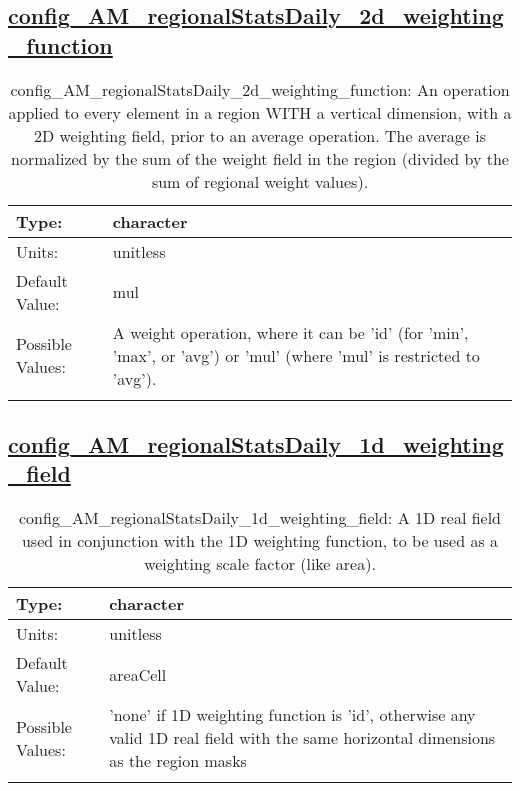 \subsection[config\_AM\_regionalStatsDaily\_2d\_weighting\_function]{\hyperref[sec:nm_tab_AM_regionalStatsDaily]{config\_AM\_regionalStatsDaily\_2d\_weighting\_function}}
\label{subsec:nm_sec_config_AM_regionalStatsDaily_2d_weighting_function}
\begin{center}
\begin{longtable}{| p{2.0in} || p{4.0in} |}
    \hline
    Type: & character \\
    \hline
    Units: & \si{unitless} \\
    \hline
    Default Value: & mul \\
    \hline
    Possible Values: & A weight operation, where it can be 'id' (for 'min', 'max', or 'avg') or 'mul' (where 'mul' is restricted to 'avg'). \\
    \hline
    \caption{config\_AM\_regionalStatsDaily\_2d\_weighting\_function: An operation applied to every element in a region WITH a vertical dimension, with a 2D weighting field, prior to an average operation. The average is normalized by the sum of the weight field in the region (divided by the sum of regional weight values).}
\end{longtable}
\end{center}
\subsection[config\_AM\_regionalStatsDaily\_1d\_weighting\_field]{\hyperref[sec:nm_tab_AM_regionalStatsDaily]{config\_AM\_regionalStatsDaily\_1d\_weighting\_field}}
\label{subsec:nm_sec_config_AM_regionalStatsDaily_1d_weighting_field}
\begin{center}
\begin{longtable}{| p{2.0in} || p{4.0in} |}
    \hline
    Type: & character \\
    \hline
    Units: & \si{unitless} \\
    \hline
    Default Value: & areaCell \\
    \hline
    Possible Values: & 'none' if 1D weighting function is 'id', otherwise any valid 1D real field with the same horizontal dimensions as the region masks \\
    \hline
    \caption{config\_AM\_regionalStatsDaily\_1d\_weighting\_field: A 1D real field used in conjunction with the 1D weighting function, to be used as a weighting scale factor (like area).}
\end{longtable}
\end{center}
